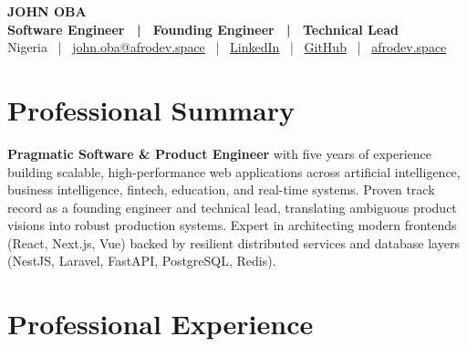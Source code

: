 \documentclass[10pt,a4paper]{article}
\begin{document}
\begin{center}
  {\Huge \textbf{\color{primary} JOHN OBA}} \\
  \vspace{4pt}
  {\large \textbf{\color{secondary} Software Engineer \ | \ Founding Engineer \ | \ Technical Lead}} \\
  \vspace{5pt}
  {\small 
    Nigeria \ | \ 
    \href{mailto:john.oba@afrodev.space}{\textcolor{accent}{john.oba@afrodev.space}} \ | \ 
    \href{https://linkedin.com}{\textcolor{accent}{LinkedIn}} \ | \ 
    \href{https://github.com}{\textcolor{accent}{GitHub}} \ | \ 
    \href{https://afrodev.space}{\textcolor{accent}{afrodev.space}}
  }
\end{center}

\section{Professional Summary}
\noindent
\textbf{Pragmatic Software \& Product Engineer} with five years of experience building scalable, high-performance web applications across artificial intelligence, business intelligence, fintech, education, and real-time systems. Proven track record as a founding engineer and technical lead, translating ambiguous product visions into robust production systems. Expert in architecting modern frontends (React, Next.js, Vue) backed by resilient distributed services and database layers (NestJS, Laravel, FastAPI, PostgreSQL, Redis).

\section{Professional Experience}
\end{document}
